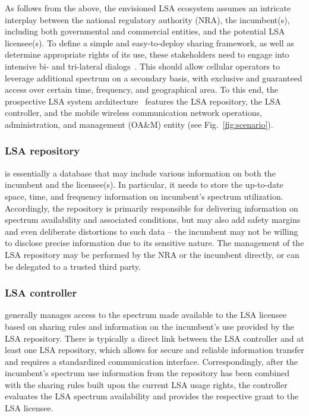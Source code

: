 \documentclass[journal]{IEEEtran}
\begin{document}
As follows from the above, the envisioned LSA ecosystem assumes an intricate interplay between the national regulatory authority (NRA), the incumbent(s), including both governmental and commercial entities, and the potential LSA licensee(s). To define a simple and easy-to-deploy sharing framework, as well as determine appropriate rights of its use, these stakeholders need to engage into intensive bi- and tri-lateral dialogs~\cite{Aho14}. This should allow cellular operators to leverage additional spectrum on a secondary basis, with exclusive and guaranteed access over certain time, frequency, and geographical area. To this end, the prospective LSA system architecture~\cite{TS235} features the LSA repository, the LSA controller, and the mobile wireless communication network operations, administration, and management (OA\&M) entity (see Fig.~\ref{fig:scenario}).

\subsubsection{LSA repository} is essentially a database that may include various information on both the incumbent and the licensee(s). In particular, it needs to store the up-to-date space, time, and frequency information on incumbent's spectrum utilization. Accordingly, the repository is primarily responsible for delivering information on spectrum availability and associated conditions, but may also add safety margins and even deliberate distortions to such data -- the incumbent may not be willing to disclose precise information due to its sensitive nature. The management of the LSA repository may be performed by the NRA or the incumbent directly, or can be delegated to a trusted third party. 

\subsubsection{LSA controller} generally manages access to the spectrum made available to the LSA licensee based on sharing rules and information on the incumbent's use provided by the LSA repository. There is typically a direct link between the LSA controller and at least one LSA repository, which allows for secure and reliable information transfer and requires a standardized communication interface. Correspondingly, after the incumbent's spectrum use information from the repository has been combined with the sharing rules built upon the current LSA usage rights, the controller evaluates the LSA spectrum availability and provides the respective grant to the LSA licensee.
\end{document}
